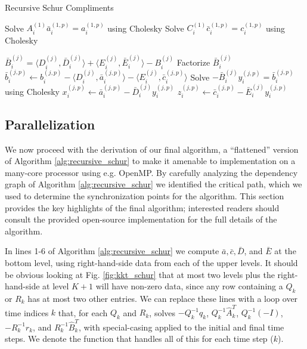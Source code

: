 \documentclass[../root.tex]{subfiles}
\newcommand{\0}{{\transparent{0} \resizebox{\mycellheight}{\mycellheight}{0}}}
\begin{document}
\begin{algorithm}
    \caption{Recursive Schur Compliments}
    \begin{algorithmic}[1]
        \For {$i \in (0,2^{K-1}]$}
            \For {$p \in (0,K+1]$}
                \State Solve $A_i^{(1)} \bar{a}_i^{(1,p)} = a_i^{(1,p)}$ using Cholesky
                \State Solve $C_i^{(1)} \bar{c}_i^{(1,p)} = c_i^{(1,p)}$ using Cholesky
            \EndFor
        \EndFor

        \For {$j \in (0,K]$}
            \For {$i \in (0,2^{K-j}]$}
                \State $\bar{B}_i^{(j)} = \langle D_i^{(j)}, \bar{D}_i^{(j)} \rangle 
                                        + \langle E_i^{(j)}, \bar{E}_i^{(j)} \rangle
                                        - B_i^{(j)}$
                \State Factorize $\bar{B}_i^{(j)}$
                \For {$p \in (j,K+1]$}
                    \State $\bar{b}_i^{(j,p)} \leftarrow b_i^{(j,p)} 
                        - \langle D_i^{(j)}, \bar{a}_i^{(j,p)} \rangle
                        - \langle E_i^{(j)}, \bar{c}_i^{(j,p)} \rangle$
                    \State Solve $-\bar{B}_i^{(j)} y_i^{(j,p)} = \bar{b}_i^{(j,p)}$ using Cholesky
                    \State $x_i^{(j,p)} \leftarrow \bar{a}_i^{(j,p)} - \bar{D}_i^{(j)} y_i^{(j,p)}$
                    \State $z_i^{(j,p)} \leftarrow \bar{c}_i^{(j,p)} - \bar{E}_i^{(j)} y_i^{(j,p)}$
                \EndFor
            \EndFor 
        \EndFor
    \end{algorithmic} 
    \label{alg:recursive_schur}
\end{algorithm}

\subsection{Parallelization} \label{sec:parallel_lqr}

We now proceed with the derivation of our final algorithm, a ``flattened'' version of
Algorithm \ref{alg:recursive_schur} to make it amenable to implementation on a many-core
processor using e.g. OpenMP. By carefully analyzing the dependency graph of Algorithm 
\ref{alg:recursive_schur} we identified the critical path, which we used to determine the 
synchronization points for the algorithm. This section provides the key highlights of the 
final algorithm; interested readers should consult the provided open-source implementation
for the full details of the algorithm.

In lines 1-6 of Algorithm \ref{alg:recursive_schur} we compute $\bar{a}, \bar{c}, \bar{D}$, and
$\bar{E}$ at the bottom level, using right-hand-side data from each of the upper levels.  It
should be obvious looking at Fig. \ref{fig:kkt_schur} that at most two levels plus the
right-hand-side at level $K+1$ will have non-zero data, since any row containing a $Q_k$ or
$R_k$ has at most two other entries.  We can replace these lines with a loop over time
indices $k$ that, for each $Q_k$ and $R_k$, solves $-Q_k^{-1} q_k$, $Q_k^{-1} \hat{A}_k^T$,
$Q_k^{-1} (-I)$, $-R_k^{-1} r_k$, and $R_k^{-1} \hat{B}_k^{T}$, with special-casing applied
to the initial and final time steps.  We denote the function that handles all of this for
each time step ($k$).
\end{document}
